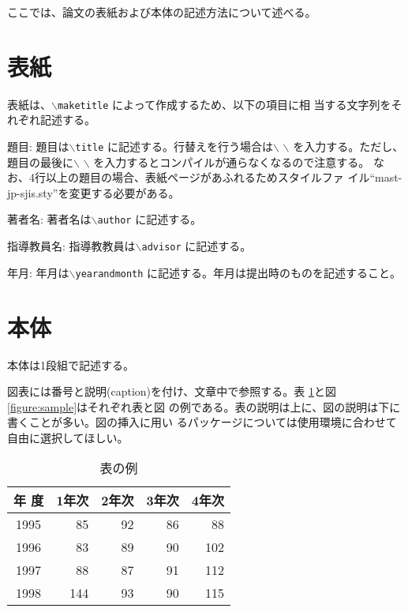 \documentclass[a4paper,11pt]{jreport}
\begin{document}
ここでは、論文の表紙および本体の記述方法について述べる。

\section{表紙}

表紙は、{\tt $\backslash$maketitle} によって作成するため、以下の項目に相
当する文字列をそれぞれ記述する。

\begin{description} \parskip=1pt
\item{題目: }
題目は{\tt $\backslash$title} に記述する。行替えを行う場合は$\backslash$
	   $\backslash$ を入力する。ただし、題目の最後に$\backslash$
	   $\backslash$ を入力するとコンパイルが通らなくなるので注意する。
	   なお、4行以上の題目の場合、表紙ページがあふれるためスタイルファ
	   イル``mast-jp-sjis.sty''を変更する必要がある。
\item{著者名: }
著者名は{\tt $\backslash$author} に記述する。
\item{指導教員名: }
指導教教員は{\tt $\backslash$advisor} に記述する。
\item{年月: }
年月は{\tt $\backslash$yearandmonth} に記述する。年月は提出時のものを記述すること。
\end{description}

\section{本体}

本体は1段組で記述する。

図表には番号と説明(caption)を付け、文章中で参照する。表
\ref{table:fundamental_data_type}と図\ref{figure:sample}はそれぞれ表と図
の例である。表の説明は上に、図の説明は下に書くことが多い。図の挿入に用い
るパッケージについては使用環境に合わせて自由に選択してほしい。

\begin{table}[hbt]
\caption{表の例}
\label{table:fundamental_data_type}
\begin{center}
\begin{tabular}{| c | r | r | r | r |}
\hline
年 度 & 1年次 & 2年次 & 3年次 & 4年次 \\
\hline
1995 & 85 & 92 & 86 & 88 \\
1996 & 83 & 89 & 90 & 102 \\
1997 & 88 & 87 & 91 & 112 \\
1998 & 144 & 93 & 90 & 115 \\
\hline 
\end{tabular}
\end{center}
\end{table}
\medskip
\end{document}
